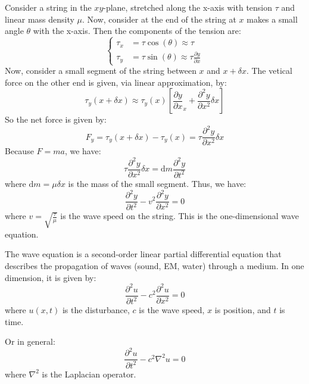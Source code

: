 \documentclass[11pt]{report}
\begin{document}
\begin{example}
    Consider a string in the $xy$-plane, stretched along the x-axis with tension \( \tau \) and linear mass density \( \mu \). Now, consider at the end of the string at $x$ makes a small angle \( \theta \) with the x-axis. Then the components of the tension are:
    $$
    \begin{cases}
        \tau_x &= \tau \cos(\theta) \approx \tau \\
        \tau_y &= \tau \sin(\theta) \approx \tau \frac{\partial y}{\partial x}
    \end{cases}
    $$
    Now, consider a small segment of the string between \( x \) and \( x + \delta x \). The vetical force on the other end is given, via linear approximation, by:
    $$    
        \tau_y(x + \delta x) \approx \tau_y(x) \left[ \frac{\partial y}{\partial x}_x + \frac{\partial^2 y}{\partial x^2} \delta x \right]
    $$
    So the net force is given by:
    $$
        F_y = \tau_y(x + \delta x) - \tau_y(x) = \tau \frac{\partial^2 y}{\partial x^2} \delta x
    $$
    Because \( F=ma \), we have:
    $$
        \tau \frac{\partial^2 y}{\partial x^2} \delta x = \text{d}m \frac{\partial^2 y}{\partial t^2}
    $$
    where \( \text{d}m = \mu \delta x \) is the mass of the small segment. Thus, we have:
    $$
        \frac{\partial^2 y}{\partial t^2} - v^2 \frac{\partial^2 y}{\partial x^2} = 0
    $$
    where \( v = \sqrt{\frac{\tau}{\mu}} \) is the wave speed on the string. This is the one-dimensional wave equation.

\end{example}
\begin{definition}
    The wave equation is a second-order linear partial differential equation that describes the propagation of waves (sound, EM, water) through a medium. In one dimension, it is given by:
    \begin{equation}
        \frac{\partial^2 u}{\partial t^2} - c^2 \frac{\partial^2 u}{\partial x^2} = 0
    \end{equation}
    where $u(x,t)$ is the disturbance, $c$ is the wave speed, $x$ is position, and $t$ is time.

    Or in general:
    \begin{equation}
        \frac{\partial^2 u}{\partial t^2} - c^2 \nabla^2 u = 0
    \end{equation}
    where \( \nabla^2 \) is the Laplacian operator.
\end{definition}
\end{document}
